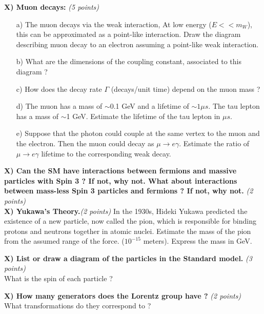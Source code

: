 {\textbf{X) Muon decays: } \hfill \textit{(5 points)}\\
\begin{itemize}
  \item[a)]{ The muon decays via the weak interaction,  At low energy ($E << m_W$), this can be approximated as a point-like interaction. 
  Draw the diagram describing muon decay to an electron assuming a point-like weak interaction.}
  \item[b)]{ What are the dimensions of the coupling constant, associated to this diagram  ?
  }
  \item[c)] How does the decay rate $\Gamma$ (decays/unit time)  depend on the muon mass ?
  \item[d)] The muon has a mass of $\sim$0.1 GeV and a lifetime of $\sim 1 \mu s$. The tau lepton has a mass of {$\sim$1 GeV}. Estimate the lifetime of the tau lepton in $\mu s$.
  \item[e)] {Suppose that the photon could couple at the same vertex to the muon and the electron. Then the muon could decay as $\mu\rightarrow e \gamma$. 
  Estimate the ratio of $\mu\rightarrow e \gamma$ lifetime to the corresponding weak decay.}
\end{itemize}

\textbf{X) Can the SM have interactions between fermions and massive particles with Spin 3 ? If not, why not.  What about interactions between mass-less Spin 3 particles and fermions ? If not, why not. }\hfill \textit{(2 points)}\\


\textbf{X) Yukawa’s Theory.}\hfill \textit{(2 points)}
In the 1930s, Hideki Yukawa predicted the existence of a new particle, now called the pion, which is responsible for binding protons and neutrons together in atomic nuclei. 
Estimate the mass of the pion from the assumed range of the force. ($10^{-15}$ meters). 
Express the mass in GeV.


\textbf{X) List or draw a diagram of the particles in the Standard model. } \hfill \textit{(3 points)}\\
What is the spin of each particle ?

\textbf{X)  How many generators does the Lorentz group have ? }\hfill \textit{(2 points)}\\
What transformations do they correspond to ?



}
